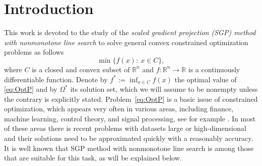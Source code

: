 
\chapter*{Introduction}
\thispagestyle{empty}



This  work is  devoted  to the study of  the {\it scaled gradient projection (SGP) method with nonmonotone line search} to solve general convex constrained optimization problems as follows
\begin{equation} \label{eq:OptP}
	\min \{ f(x) :~   x\in C\},
\end{equation}
where $C$ is a closed and convex subset of $\mathbb{R}^n$ and $f:\mathbb{R}^n \to \mathbb{R}$ is a continuously differentiable function. Denote by $f^*:= \inf_{x\in C} f(x)$ the optimal value  of \eqref{eq:OptP} and by  $\Omega^*$  its  solution set, which we will assume to be nonempty unless the contrary is explicitly stated.  Problem~\eqref{eq:OptP} is a basic issue of constrained  optimization, which appears very often in various areas, including  finance,    machine learning, control theory, and signal processing, see for example \cite{Bottou_Curtis_Nocedal2018, Boyd_Ghaoui_Ferron1994, Figueiredo2007, Higham2002, Ma_Hu_Gao2015, Sra_Nowozin_Wright2012}.  In most of these areas there is recent problems with datasets large or high-dimensional  and their solutions need to be approximated quickly with a reasonably accuracy. It is well known that SGP method with nonmonotone line search is among those that are suitable for this task, as will be explained below.

